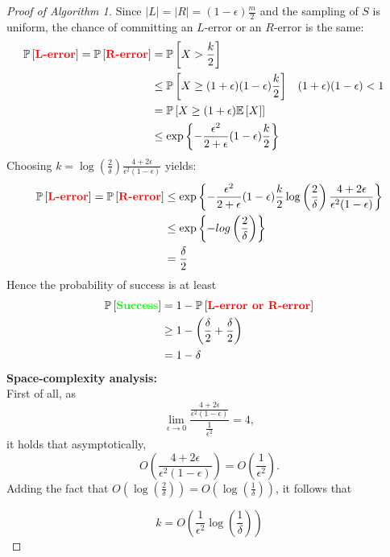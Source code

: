 \documentclass[10pt,usenames,dvipsnames]{article}
\newcommand{\Pbb}{\mathbb{P}}
\newcommand{\Ebb}{\mathbb{E}}
\newenvironment{exercise}[2][Exercise]{\begin{trivlist}
  \item[\hskip \labelsep {\bfseries #1}\hskip \labelsep {\bfseries #2.}]}{\end{trivlist}}
\begin{document}
\begin{exercise}{1}
\begin{proof}[Proof of Algorithm 1]
Since $|L| = |R| = (1 - \epsilon)\frac{m}{2}$ and the sampling of $S$ is
uniform, the chance of committing an $L$-error or an $R$-error is the same:
\begin{align*}
  \Pbb\left[ \text{\textbf{\color{red} L-error}} \right] = \Pbb\left[
    \text{\textbf{\color{red} R-error}} \right] &= \Pbb\left[ X > \frac{k}{2}
  \right]  \\
  & \leq \Pbb\left[ X \geq (1 + \epsilon)(1 - \epsilon)\frac{k}{2}\right] && (1
  + \epsilon)(1 - \epsilon) < 1\\ 
  & = \Pbb\left[ X \geq (1 +\epsilon) \Ebb\left[ X \right] \right] \\
  & \leq\exp\left\{-\frac{\epsilon^2}{2 + \epsilon} (1 - \epsilon)\frac{k}{2}\right\}
\end{align*}
Choosing $k = \log\left( \frac{2}{\delta} \right) \frac{4 + 2
  \epsilon}{\epsilon^2(1 - \epsilon)}$ yields:
\begin{align*}
  \Pbb\left[ \text{\textbf{\color{red} L-error}} \right] = \Pbb\left[
    \text{\textbf{\color{red} R-error}} \right] & \leq \exp\left\{ -\frac{\epsilon^2}{2 + \epsilon} (1 - \epsilon)\frac{k}{2}\log\left( \frac{2}{\delta} \right) \frac{4 + 2
  \epsilon}{\epsilon^2(1 - \epsilon)}\right\} \\
  & \leq \exp\left\{ -log\left( \frac{2}{\delta} \right) \right\} \\
  & = \frac{\delta}{2}
\end{align*}
Hence the probability of success is at least
\begin{align*}
  \Pbb\left[ \text{\textbf{\color{green}Success}} \right] &= 1 - \Pbb\left[ \text{\textbf{\color{red} L-error or R-error}} \right] \\
  &\geq 1 - \left(\frac{\delta}{2} + \frac{\delta}{2}\right) \\
  &= 1 - \delta
\end{align*}
\textbf{Space-complexity analysis:} \\
First of all, as
\begin{equation}
  \lim_{\epsilon \to 0} \frac{\frac{4 + 2\epsilon}{\epsilon^2(1 - \epsilon)}}{\frac{1}{\epsilon^2}} = 4,
\end{equation}
it holds that asymptotically, $$O\left( \frac{4 + 2 \epsilon}{\epsilon^2(1 - \epsilon)} \right) = O\left(
  \frac{1}{\epsilon^2} \right).$$
Adding the fact that $O\left( \log\left(  \frac{2}{\delta} \right)\right) =
O\left( \log\left( \frac{1}{\delta} \right) \right)$, it follows that

\begin{equation}
  k = O\left(\frac{1}{\epsilon^2} \log\left( \frac{1}{\delta} \right)\right)
\end{equation}


\end{proof}
\end{exercise}
\end{document}
